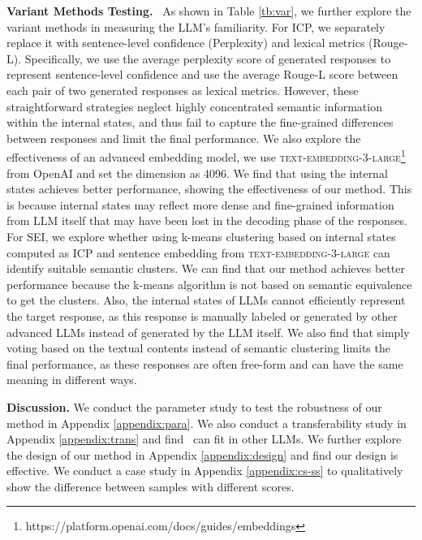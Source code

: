 \noindent
\textbf{Variant Methods Testing.}
\
As shown in Table \ref{tb:var}, we further explore the variant methods in measuring the LLM's familiarity.
For ICP, we separately replace it with sentence-level confidence (Perplexity) and lexical metrics (Rouge-L).
Specifically, we use the average perplexity score of generated responses to represent sentence-level confidence and use the average Rouge-L score between each pair of two generated responses as lexical metrics.
However, these straightforward strategies neglect highly concentrated semantic information within the internal states, and thus fail to capture the fine-grained differences between responses and limit the final performance.
We also explore the effectiveness of an advanced embedding model, we use \textsc{text-embedding-3-large}\footnote{https://platform.openai.com/docs/guides/embeddings} from OpenAI and set the dimension as 4096.
We find that using the internal states achieves better performance, showing the effectiveness of our method.
This is because internal states may reflect more dense and fine-grained information from LLM itself that may have been lost in the decoding phase of the responses.
For SEI, we explore whether using k-means clustering based on internal states computed as ICP and sentence embedding from \textsc{text-embedding-3-large} can identify suitable semantic clusters.
We can find that our method achieves better performance because the k-means algorithm is not based on semantic equivalence to get the clusters.
Also, the internal states of LLMs cannot efficiently represent the target response, as this response is manually labeled or generated by other advanced LLMs instead of generated by the LLM itself.
We also find that simply voting based on the textual contents instead of semantic clustering limits the final performance, as these responses are often free-form and can have the same meaning in different ways. 




\noindent
\textbf{Discussion.}
We conduct the parameter study to test the robustness of our method in Appendix \ref{appendix:para}.
We also conduct a transferability study in Appendix \ref{appendix:trans} and find \OURS~can fit in other LLMs.
We further explore the design of our method in Appendix \ref{appendix:design} and find our design is effective.
We conduct a case study in Appendix \ref{appendix:cs-ss} to qualitatively show the difference between samples with different scores.

